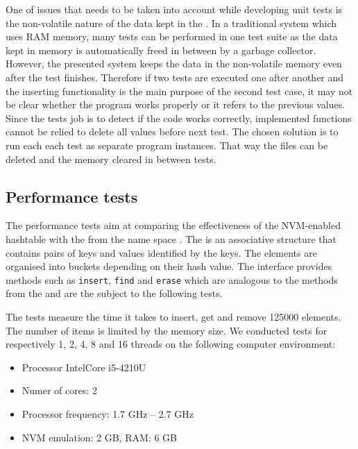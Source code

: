         One of issues that needs to be taken into account while developing unit tests is the non-volatile nature of the data kept in the \NvmHashMap. 
        In a traditional system which uses RAM memory, many tests can be performed in one test suite as the data kept in memory is automatically freed in between by a garbage collector.
        However, the presented system keeps the data in the non-volatile memory even after the test finishes.
        Therefore if two tests are executed one after another and the inserting functionality is the main purpose of the second test case, it may not be clear whether the program works properly or it refers to the previous values. 
        Since the tests job is to detect if the code works correctly, implemented functions cannot be relied to delete all values before next test. 
        The chosen solution is to run each each test as separate program instances.
        That way the files can be deleted and the memory cleared in between tests.

    \subsection{Performance tests}
        The performance tests aim at comparing the effectiveness of the NVM-enabled hashtable with the \unorderedMap from the \std name space \cite{UnorderedMapCpp}. 
        The \unorderedMap is an associative structure that contains pairs of keys and values identified by the keys. 
        The elements are organised into buckets depending on their hash value. 
        The interface provides methods such as \texttt{insert}, \texttt{find} and \texttt{erase} which are analogous to the methods from the \NvmHashMap and are the subject to the following tests.
        
        The tests measure the time it takes to insert, get and remove 125000 elements. 
        The number of items is limited by the memory size. 
        We conducted tests for respectively 1, 2, 4, 8 and 16 threads on the following computer environment:
        \begin{itemize}
            \item Processor IntelCore i5-4210U 
            \item Numer of cores: 2
            \item Processor frequency: 1.7 GHz -- 2.7 GHz
            \item NVM emulation: 2 GB, RAM: 6 GB
            
        \end{itemize}
        
